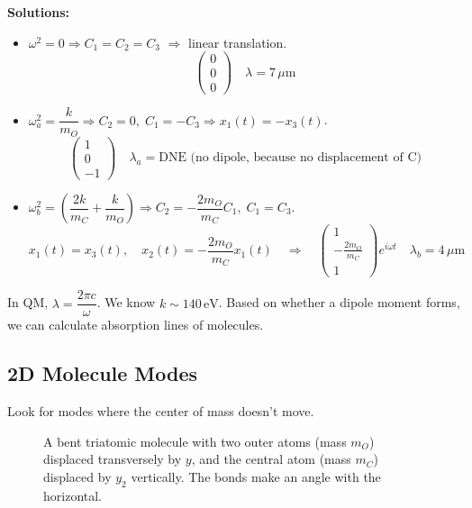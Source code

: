 \textbf{Solutions:}

\begin{itemize}
    \item $\omega^2 = 0 \Rightarrow C_1 = C_2 = C_3$ $\Rightarrow$ linear translation.
    \[
        \begin{pmatrix}0\\0\\0\end{pmatrix} \quad \lambda = 7\,\mu\text{m}
    \]

    \item $\omega_a^2 = \dfrac{k}{m_O} \Rightarrow C_2 = 0,\; C_1 = -C_3 \Rightarrow x_1(t) = -x_3(t)$.
    \[
        \begin{pmatrix}1\\0\\-1\end{pmatrix} \quad \lambda_a = \text{DNE (no dipole, because no displacement of C)}
    \]

    \item $\omega_b^2 = \left(\dfrac{2k}{m_C} + \dfrac{k}{m_O}\right)
    \Rightarrow C_2 = -\dfrac{2m_O}{m_C}C_1,\; C_1 = C_3$.
    \[
        x_1(t) = x_3(t), \quad x_2(t) = -\frac{2m_O}{m_C}x_1(t)
        \quad\Rightarrow\quad
        \begin{pmatrix}1 \\ -\frac{2m_O}{m_C} \\ 1\end{pmatrix}e^{i\omega t}
        \quad \lambda_b = 4\,\mu\text{m}
    \]
\end{itemize}

\begin{example}
In QM, $\lambda = \dfrac{2\pi c}{\omega}$. We know $k \sim 140\,\text{eV}$.
Based on whether a dipole moment forms, we can calculate absorption lines of molecules.
\end{example}

\subsection{2D Molecule Modes}

Look for modes where the center of mass doesn't move.

\begin{figure}[H]
\centering
\caption{A bent triatomic molecule with two outer atoms (mass $m_O$) displaced transversely by $y$, and the central atom (mass $m_C$) displaced by $y_2$ vertically. The bonds make an angle with the horizontal.}
\end{figure}

